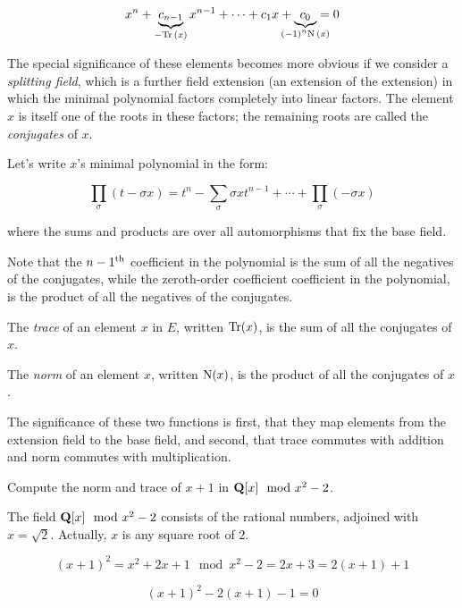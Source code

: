 \begin{key point}
\huge
\begin{equation*}
x^n + \underbrace{c_{n-1}}_{- \Tr(x)} x^{n-1} + \cdots + c_1 x + \underbrace{c_0}_{\mathclap{(-1)^n \N(x)}} = 0
\end{equation*}
\end{key point}

The special significance of these elements becomes more obvious if we
consider a {\it splitting field}, which is a further field extension
(an extension of the extension) in which the minimal polynomial
factors completely into linear factors.  The element $x$ is
itself one of the roots in these factors; the remaining
roots are called the {\it conjugates} of $x$.

Let's write $x$'s minimal polynomial in the form:


$$\prod_\sigma \left( t - \sigma x \right) = t^n - \sum_\sigma \sigma x t^{n-1} + \cdots + \prod_\sigma (-\sigma x) $$

where the sums and products are over all automorphisms that fix the base field.

Note that the $n-1^{\rm th}$ coefficient in the polynomial is the sum
of all the negatives of the conjugates, while the zeroth-order
coefficient coefficient in the polynomial, is the product of all the
negatives of the conjugates.

The {\it trace} of an element $x$ in $E$, written ${\rm Tr}(x)$, is
the sum of all the conjugates of $x$.
\enddefinition

The {\it norm} of an element $x$, written ${\rm N}(x)$, is the product
of all the conjugates of $x$.
\enddefinition

The significance of these two functions is first, that they map
elements from the extension field to the base field, and second, that
trace commutes with addition and norm commutes with multiplication.

\example Compute the norm and trace of $x+1$ in ${\bf Q}[x] \mod x^2-2$.

The field ${\bf Q}[x] \mod x^2-2$ consists of the rational numbers,
adjoined with $x=\sqrt{2}$.  Actually, $x$ is any square root of $2$.

$$(x+1)^2 = x^2+2x+1 \mod x^2-2 = 2x+3 = 2(x+1) + 1$$

$$(x+1)^2 - 2(x+1) - 1 = 0$$

